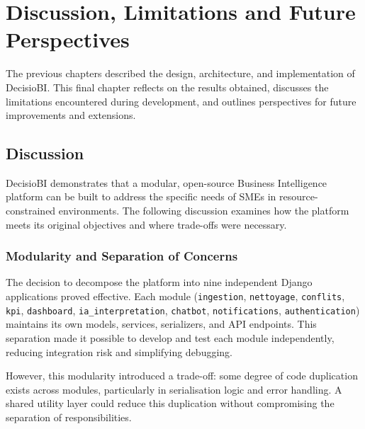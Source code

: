 
\chapter{Discussion, Limitations and Future Perspectives}


\noindent
The previous chapters described the design, architecture,
and implementation of DecisioBI.
This final chapter reflects on the results obtained,
discusses the limitations encountered during development,
and outlines perspectives for future improvements
and extensions.


\section{Discussion}

\noindent
DecisioBI demonstrates that a modular, open-source
Business Intelligence platform can be built
to address the specific needs of SMEs
in resource-constrained environments.
The following discussion examines
how the platform meets its original objectives
and where trade-offs were necessary.

\subsection{Modularity and Separation of Concerns}

\noindent
The decision to decompose the platform into nine
independent Django applications proved effective.
Each module (\texttt{ingestion}, \texttt{nettoyage},
\texttt{conflits}, \texttt{kpi}, \texttt{dashboard},
\texttt{ia\_interpretation}, \texttt{chatbot},
\texttt{notifications}, \texttt{authentication})
maintains its own models, services, serializers,
and API endpoints.
This separation made it possible to develop
and test each module independently,
reducing integration risk
and simplifying debugging.

\vspace{0.3cm}
\noindent
However, this modularity introduced a trade-off:
some degree of code duplication exists
across modules, particularly in serialisation
logic and error handling.
A shared utility layer could reduce this duplication
without compromising the separation of responsibilities.

